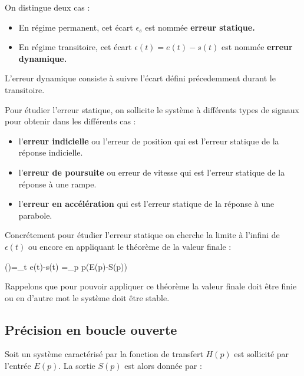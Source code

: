 On distingue deux cas :
\begin{itemize}
    \item En régime permanent, cet écart $\epsilon_s$ est nommée 
		  \textbf{erreur statique. }
    \item En régime transitoire, cet écart $\epsilon(t)=e(t)-s(t)$ est 
		  nommée \textbf{erreur dynamique.}
\end{itemize}

L'erreur dynamique consiste à suivre l'écart défini précedemment durant 
le transitoire.

Pour étudier l'erreur statique, on sollicite le système à différents 
types de signaux pour obtenir dans les différents cas :
\begin{itemize}
	\item l'\textbf{erreur indicielle} ou l'erreur de position qui est 
		  l'erreur statique de la réponse indicielle.
	\item l'\textbf{erreur de poursuite} ou erreur de vitesse qui est 
		  l'erreur statique de la réponse à une rampe.
	\item l'\textbf{erreur en accélération} qui est l'erreur statique 
		  de la réponse à une parabole.
\end{itemize}
Concrétement pour étudier l'erreur statique on cherche la limite à l'infini 
de $\epsilon(t)$ ou encore en appliquant le théorème de la valeur finale :
\begin{bequation}
\epsilon(\infty)=\lim\limits_{t\to\infty} e(t)-s(t)
	            =\lim\limits_{p} p\big(E(p)-S(p)\big)
\end{bequation}
Rappelons que pour pouvoir appliquer ce théorème la valeur finale doit 
être finie ou en d'autre mot le système doit être stable.

\subsection{Précision en boucle ouverte}

Soit un système caractérisé par la fonction de transfert $H(p)$ 
est sollicité par l'entrée $E(p)$. La sortie $S(p)$ est alors donnée par :

\begin{center}
\end{center}

